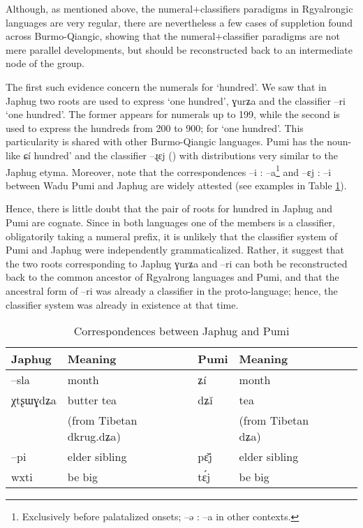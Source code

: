 \documentclass[oldfontcommands,oneside,a4paper,12pt]{article}
\newcommand{\ipa}[1]{{\phon#1}}
\begin{document}
Although, as mentioned above, the numeral+classifiers paradigms in Rgyalrongic languages are very regular, there are nevertheless a few cases of suppletion found across Burmo-Qiangic, showing that the numeral+classifier paradigms are not mere parallel developments, but should be reconstructed back to  an intermediate node of the group.

The first such evidence concern the numerals for `hundred'. We saw that in Japhug two roots are used to express `one hundred',  \ipa{ɣurʑa}  and the classifier \ipa{--ri} `one hundred'. The former appears for numerals up to 199, while the second is used to express the hundreds from 200 to 900; for `one hundred'. This particularity is shared with  other Burmo-Qiangic languages. Pumi   has the noun-like \ipa{ɕí}  hundred' and the classifier \ipa{--ɻɛj} (\citealt[101]{daudey14grammar}) with distributions very similar to the Japhug etyma. Moreover,  note that the correspondences \ipa{--i} : \ipa{--a}\footnote{Exclusively before palatalized onsets; \ipa{--ə} : \ipa{--a} in other contexts.} and \ipa{--ɛj} : \ipa{--i} between Wadu Pumi and Japhug are widely attested (see examples in Table \ref{tab:jpg.pumi}).


Hence, there is little doubt that the pair of roots for hundred in Japhug and Pumi are cognate. Since in both languages one of the members is a classifier, obligatorily taking a numeral prefix, it is unlikely that the classifier system of Pumi and Japhug were independently grammaticalized. Rather, it suggest that the two roots corresponding to Japhug \ipa{ɣurʑa} and \ipa{--ri} can both be reconstructed back to the common ancestor of Rgyalrong languages and Pumi, and that the ancestral form of \ipa{--ri} was already a classifier in the proto-language; hence, the classifier system was already in existence at that time.

\begin{table}[H]
\caption{Correspondences between Japhug and Pumi} \label{tab:jpg.pumi} \centering
\begin{tabular}{llllll}
\toprule
Japhug & Meaning & Pumi & Meaning \\
\midrule
 \ipa{--sla} &month &\ipa{ʑí} & month\\
\ipa{χtʂɯɣdʑa} &butter tea  & \ipa{dʑǐ} & tea  \\
&(from Tibetan \ipa{dkrug.dʑa})&&(from Tibetan \ipa{dʑa})&\\
\midrule
 \ipa{--pi} &elder sibling &\ipa{pɛ̌j} & elder sibling\\
  \ipa{wxti} &be big & \ipa{tɛ́j}  & be big\\
\bottomrule
\end{tabular}
\end{table}
 
\end{document}
